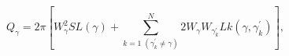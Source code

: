 \begin{equation}
Q_\gamma =2\pi [W_\gamma ^2SL(\gamma )+\sum_{k=1\;(\gamma _k^{\prime }\neq
\gamma )}^N2W_\gamma W_{\gamma _k^{\prime }}Lk(\gamma ,\gamma _k^{\prime })],
\label{before}
\end{equation}

